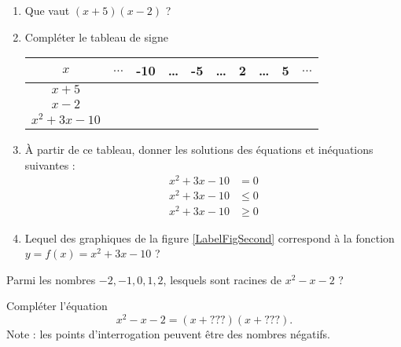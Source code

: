 
\begin{example}

\begin{enumerate}
    \item
        Que vaut \( (x+5)(x-2)\) ?
    \item
        Compléter le tableau de signe
        \begin{center}
            \begin{tabular}[h]{|c||c|c|c|c|c|c|c|c|c|}
                \hline
                    \( x\)&\( \ldots\)&-10&\ldots&-5&\ldots&2&\ldots&5&\( \ldots\)\\
                    \hline
                    \( x+5\)& & & & & & & && \\
                    \hline
                    \( x-2\)&&&&&&&&&\\
                    \hline
                    \(x^2+3x-10\)&&&&&&&&&\\
                    \hline
            \end{tabular}
        \end{center}
    \item
        À partir de ce tableau, donner les solutions des équations et inéquations suivantes :
        \begin{subequations}
            \begin{align}
                x^2+3x-10&=0\\
                x^2+3x-10&\leq0\\
                x^2+3x-10&\geq0
            \end{align}
        \end{subequations}
    \item
        Lequel des graphiques de la figure \ref{LabelFigSecond} correspond à la fonction \( y=f(x)=x^2+3x-10\) ?
\newcommand{\CaptionFigSecond}{Laquelle de ces trois courbes est \( x^2+3x-10\) ?}


\end{enumerate}
    
\end{example}

\begin{example}
    Parmi les nombres \( -2,-1,0,1,2\), lesquels sont racines de \( x^2-x-2\) ?

    Compléter l'équation
    \begin{equation}
        x^2-x-2=(x+???)(x+???).
    \end{equation}
    Note : les points d'interrogation peuvent être des nombres négatifs.
\end{example}

